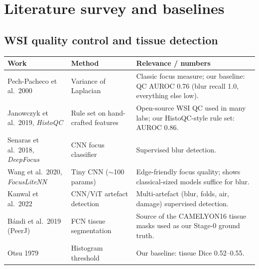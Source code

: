 \chapter{Literature survey and baselines}

\section{WSI quality control and tissue detection}
\begin{longtable}{p{4.2cm}p{4.2cm}p{7.4cm}}\toprule
\textbf{Work} & \textbf{Method} & \textbf{Relevance / numbers}\\\midrule
Pech-Pacheco et al.\ 2000 & Variance of Laplacian & Classic focus measure; our baseline: QC AUROC 0.76 (blur recall 1.0, everything else low).\\
Janowczyk et al.\ 2019, \emph{HistoQC} & Rule set on hand-crafted features & Open-source WSI QC used in many labs; our HistoQC-style rule set: AUROC 0.86.\\
Senaras et al.\ 2018, \emph{DeepFocus} & CNN focus classifier & Supervised blur detection.\\
Wang et al.\ 2020, \emph{FocusLiteNN} & Tiny CNN ($\sim$100 params) & Edge-friendly focus quality; shows classical-sized models suffice for blur.\\
Kanwal et al.\ 2022 & CNN/ViT artefact detection & Multi-artefact (blur, folds, air, damage) supervised detection.\\
B\'andi et al.\ 2019 (PeerJ) & FCN tissue segmentation & Source of the CAMELYON16 tissue masks used as our Stage-0 ground truth.\\
Otsu 1979 & Histogram threshold & Our baseline: tissue Dice 0.52--0.55.\\
\bottomrule\end{longtable}


